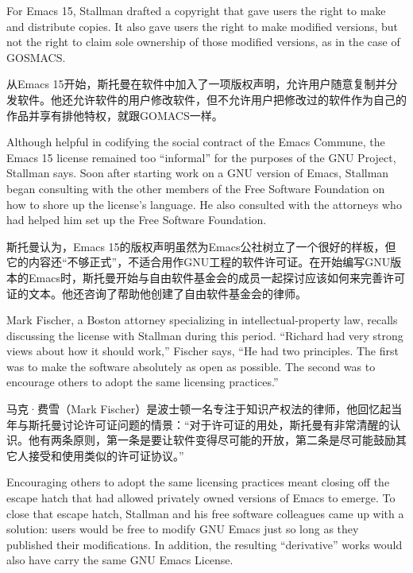 \ifdefined\eng
For Emacs 15, Stallman drafted a copyright that gave users the right to make and distribute copies. It also gave users the right to make modified versions, but not the right to claim sole ownership of those modified versions, as in the case of GOSMACS.
\fi

\ifdefined\chs
从Emacs 15开始，斯托曼在软件中加入了一项版权声明，允许用户随意复制并分发软件。他还允许软件的用户修改软件，但不允许用户把修改过的软件作为自己的作品并享有排他特权，就跟GOMACS一样。
\fi

\ifdefined\eng
Although helpful in codifying the social contract of the Emacs Commune, the Emacs 15 license remained too ``informal'' for the purposes of the GNU Project, Stallman says. Soon after starting work on a GNU version of Emacs, Stallman began consulting with the other members of the Free Software Foundation on how to shore up the license's language. He also consulted with the attorneys who had helped him set up the Free Software Foundation.
\fi

\ifdefined\chs
斯托曼认为，Emacs 15的版权声明虽然为Emacs公社树立了一个很好的样板，但它的内容还``不够正式''，不适合用作GNU工程的软件许可证。在开始编写GNU版本的Emacs时，斯托曼开始与自由软件基金会的成员一起探讨应该如何来完善许可证的文本。他还咨询了帮助他创建了自由软件基金会的律师。
\fi

\ifdefined\eng
Mark Fischer, a Boston attorney specializing in intellectual-property law, recalls discussing the license with Stallman during this period. ``Richard had very strong views about how it should work,'' Fischer says, ``He had two principles. The first was to make the software absolutely as open as possible. The second was to encourage others to adopt the same licensing practices.''
\fi

\ifdefined\chs
马克·费雪（Mark Fischer）是波士顿一名专注于知识产权法的律师，他回忆起当年与斯托曼讨论许可证问题的情景：``对于许可证的用处，斯托曼有非常清醒的认识。他有两条原则，第一条是要让软件变得尽可能的开放，第二条是尽可能鼓励其它人接受和使用类似的许可证协议。''
\fi

\ifdefined\eng
Encouraging others to adopt the same licensing practices meant closing off the escape hatch that had allowed privately owned versions of Emacs to emerge. To close that escape hatch, Stallman and his free software colleagues came up with a solution: users would be free to modify GNU Emacs just so long as they published their modifications. In addition, the resulting ``derivative'' works would also have carry the same GNU Emacs License.
\fi

